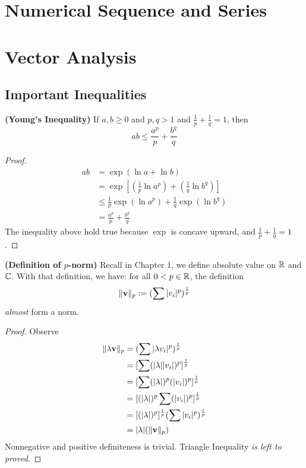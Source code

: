 \documentclass{report}
\begin{document}
\chapter{Numerical Sequence and Series}
\chapter{Vector Analysis}
\section{Important Inequalities}
\begin{theorem}
\label{4.1.1}
\textbf{(Young's Inequality)} If $a,b\geq 0$ and $p,q>1$ and  $\frac{1}{p}+\frac{1}{q}=1$, then
\begin{equation}
ab\leq \frac{a^p}{p}+\frac{b^q}{q}
\end{equation}
\end{theorem}
\begin{proof}
\begin{align}
  ab&=\exp(\ln a+ \ln b)\\
    &=\exp[(\frac{1}{p}\ln a^p)+(\frac{1}{q}\ln b^q)]\\
&\leq \frac{1}{p}\exp(\ln a^p)+\frac{1}{q}\exp(\ln b^q)\\
&= \frac{a^p}{p}+\frac{b^q}{q}
\end{align}
The inequality above hold true because  $\exp$ is concave upward, and $\frac{1}{p}+\frac{1}{q}=1$. 
\end{proof}
\begin{theorem}
\label{4.1.2}
\textbf{(Definition of $p$-norm)} Recall in Chapter 1, we define absolute value on $\mathbb{R}$ and  $\mathbb{C}$. With that definition, we have: for all $0<p \in \mathbb{R}$, the definition
\begin{equation}
  \| \textbf{v} \|_p:= (\sum |v_i|^p)^{\frac{1}{p}}
\end{equation}
\textit{almost} form a norm.
\end{theorem}
\begin{proof}
Observe 
\begin{align}
\| \lambda \textbf{v} \|_p&=(\sum |\lambda v_i|^p)^{\frac{1}{p}} \\
&=[\sum (|\lambda ||v_i|)^p]^{\frac{1}{p}}\\
&=[\sum (|\lambda |)^p(|v_i|)^p]^{\frac{1}{p}}\\
&=[(|\lambda |)^p\sum (|v_i|)^p]^{\frac{1}{p}}\\
&=[(|\lambda |)^p]^{\frac{1}{p}}(\sum |v_i|^p)^{\frac{1}{p}}\\
&=|\lambda |(\| \textbf{v} \|_p)
\end{align}
Nonnegative and positive definiteness is trivial. Triangle Inequality \textit{is left to proved}. 
\end{proof}
\end{document}

